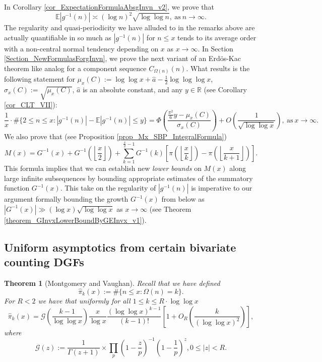 \documentclass[11pt,reqno,a4letter]{article}
\numberwithin{figure}{section}
\numberwithin{table}{section}
\newcommand{\Floor}[2]{\ensuremath{\left\lfloor \frac{#1}{#2} \right\rfloor}}
\theoremstyle{plain}
\newtheorem{theorem}{Theorem}
\numberwithin{theorem}{section}
\theoremstyle{definition}
\begin{document}
In Corollary \ref{cor_ExpectationFormulaAbsgInvn_v2}, we prove that 
\[
\mathbb{E}|g^{-1}(n)| \asymp (\log n)^2 \sqrt{\log\log n}, 
     \mathrm{\ as\ } n \rightarrow \infty. 
\]
The regularity and quasi-periodicity we have alluded to in the remarks above are actually 
quantifiable in so much as $|g^{-1}(n)|$ for $n \leq x$ 
tends to its average order with a non-central normal tendency 
depending on $x$ as $x \rightarrow \infty$. 
In Section \ref{Section_NewFormulasForgInvn}, 
we prove the next variant of an Erd\"os-Kac theorem like analog
for a component sequence $C_{\Omega(n)}(n)$. 
What results is the following statement for 
$\mu_x(C) := \log\log x + \hat{a} - \frac{1}{2}\log\log\log x$, $\sigma_x(C) := \sqrt{\mu_x(C)}$, 
$\hat{a}$ is an absolute constant, and any $y \in \mathbb{R}$ (see 
Corollary \ref{cor_CLT_VII}): 
\[
\frac{1}{x} \cdot \#\{2 \leq n \leq x: |g^{-1}(n)| - \mathbb{E}|g^{-1}(n)| \leq y\} = 
     \Phi\left(\frac{\frac{\pi^2}{6}y - \mu_x(C)}{\sigma_x(C)}\right) + 
     O\left(\frac{1}{\sqrt{\log\log x}}\right), 
     \mathrm{\ as\ } x \rightarrow \infty. 
\]
We also prove that (see Proposition \ref{prop_Mx_SBP_IntegralFormula}) 
\begin{equation} 
\label{eqn_Mx_gInvnPixk_formula_v2} 
M(x) = G^{-1}(x) + G^{-1}\left(\Floor{x}{2}\right) + 
     \sum_{k=1}^{\frac{x}{2}-1} G^{-1}(k) \left[ 
     \pi\left(\Floor{x}{k}\right) - \pi\left(\Floor{x}{k+1}\right) 
     \right]. 
\end{equation} 
This formula 
implies that we can establish new \emph{lower bounds} on $M(x)$ along large infinite subsequences 
by bounding appropriate estimates of the summatory function $G^{-1}(x)$. 
This take on the regularity of $|g^{-1}(n)|$ is imperative to our argument formally bounding the growth 
$G^{-1}(x)$ from below as $|G^{-1}(x)| \gg (\log x) \sqrt{\log\log x}$ as $x \rightarrow \infty$ 
(see Theorem \ref{theorem_GInvxLowerBoundByGEInvx_v1}). 

\subsection{Uniform asymptotics from certain bivariate counting DGFs} 

\begin{theorem}[Montgomery and Vaughan]
\label{theorem_HatPi_ExtInTermsOfGz} 
Recall that we have defined 
$$\widehat{\pi}_k(x) := \#\{n \leq x: \Omega(n)=k\}.$$ 
For $R < 2$ we have that uniformly for all $1 \leq k \leq R \cdot \log\log x$ 
\[
\widehat{\pi}_k(x) = \mathcal{G}\left(\frac{k-1}{\log\log x}\right) \frac{x}{\log x} 
     \frac{(\log\log x)^{k-1}}{(k-1)!} \left[1 + O_R\left(\frac{k}{(\log\log x)^2}\right)\right], 
\]
where 
\[
\mathcal{G}(z) := \frac{1}{\Gamma(z+1)} \times 
     \prod_p \left(1-\frac{z}{p}\right)^{-1} \left(1-\frac{1}{p}\right)^z, 0 \leq |z| < R. 
\]
\end{theorem} 
\end{document}
